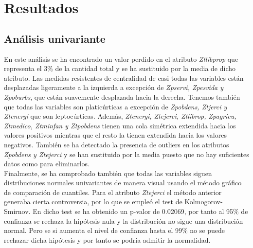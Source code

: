 \documentclass[11pt,a4paper]{article}
\begin{document}
	
	\section{Resultados}

    \subsection{Análisis univariante}

    	
    	En este análisis se ha encontrado un valor perdido en el atributo \textit{Ztlibprop} que representa el 3\% de la cantidad total y se ha sustituido por la media de dicho atributo. Las medidas resistentes de centralidad de casi todas las variables están desplazadas ligeramente a la izquierda a excepción de \textit{Zpservi, Zpesvida y Zpoburbs}, que están suavemente desplazada hacia la derecha. Tenemos también que todas las variables son platicúrticas a excepción de \textit{Zpobdens, Ztjerci y Ztenergi} que son leptocúrticas. Además, \textit{Ztenergi, Ztejerci, Ztlibrop, Zpagricu, Ztmedico, Ztminfan y Ztpobdens} tienen una cola simétrica extendida hacia los valores positivos mientras que el resto la tienen extendida hacia los valores negativos. También se ha detectado la presencia de outliers en los atributos \textit{Zpobdens y Ztejerci} y se han sustituido por la media puesto que no hay suficientes datos como para eliminarlos. \\ 
    	
    	Finalmente, se ha comprobado también que todas las variables siguen distribuciones normales univariantes de manera visual usando el método gráfico de comparación de cuantiles. Para el atributo \textit{Ztejerci} el método anterior generaba cierta controversia, por lo que se empleó el test de Kolmogorov-Smirnov. En dicho test se ha obtenido un p-valor de 0.02069, por tanto al 95\% de confianza se rechaza la hipótesis nula y la distribución no sigue una distribución normal. Pero se si aumenta el nivel de confianza hasta el 99\% no se puede rechazar dicha hipótesis y por tanto se podría admitir la normalidad.  \\
\end{document}
